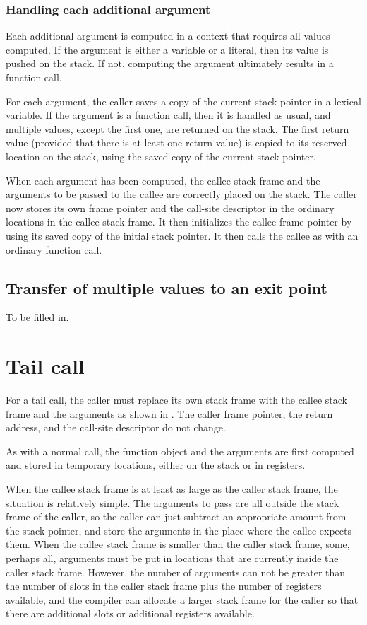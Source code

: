 \subsubsection{Handling each additional argument}

Each additional argument is computed in a context that requires
all values computed.  If the argument is either a variable or a
literal, then its value is pushed on the stack.  If not, computing the
argument ultimately results in a function call.  

For each argument, the caller saves a copy of the current stack
pointer in a lexical variable.  If the argument is a function call,
then it is handled as usual, and multiple values, except the first
one, are returned on the stack.  The first return value (provided that
there is at least one return value) is copied to its reserved location
on the stack, using the saved copy of the current stack pointer.

When each argument has been computed, the callee stack frame and the
arguments to be passed to the callee are correctly placed on the
stack.  The caller now stores its own frame pointer and the call-site
descriptor in the ordinary locations in the callee stack frame.  It
then initializes the callee frame pointer by using its saved copy of
the initial stack pointer.  It then calls the callee as with an
ordinary function call.

\subsection{Transfer of multiple values to an exit point}

To be filled in.

\section{Tail call}

For a tail call, the caller must replace its own stack frame with the
callee stack frame and the arguments as shown in
.  The caller frame pointer,
the return address, and the call-site descriptor do not change.

As with a normal call, the function object and the arguments are first
computed and stored in temporary locations, either on the stack or in
registers.

When the callee stack frame is at least as large as the caller stack
frame, the situation is relatively simple.  The arguments to pass are
all outside the stack frame of the caller, so the caller can just
subtract an appropriate amount from the stack pointer, and store the
arguments in the place where the callee expects them.  When the callee
stack frame is smaller than the caller stack frame, some, perhaps all,
arguments must be put in locations that are currently inside the
caller stack frame.  However, the number of arguments can not be
greater than the number of slots in the caller stack frame plus the
number of registers available, and the compiler can allocate a larger
stack frame for the caller so that there are additional slots or
additional registers available.

